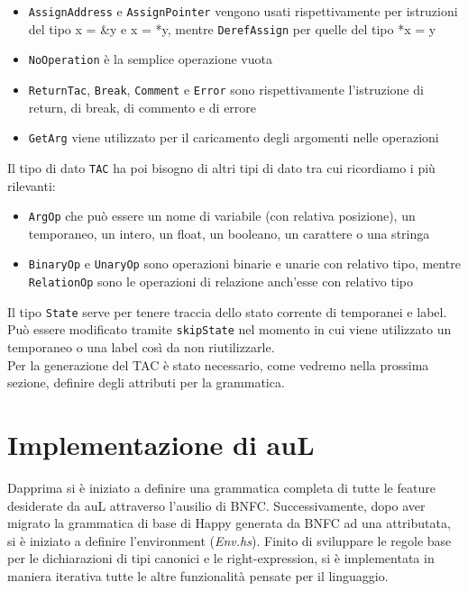 \documentclass{article}
\begin{document}
\begin{itemize}
    \item \texttt{AssignAddress} e \texttt{AssignPointer} vengono usati rispettivamente per istruzioni del tipo  x = \&y e x = *y, mentre \texttt{DerefAssign} per quelle del tipo *x = y
    \item \texttt{NoOperation} è la semplice operazione vuota
    \item \texttt{ReturnTac}, \texttt{Break}, \texttt{Comment} e \texttt{Error} sono rispettivamente l'istruzione di return, di break, di commento e di errore
    \item \texttt{GetArg} viene utilizzato per il caricamento degli argomenti nelle operazioni
\end{itemize}
Il tipo di dato \texttt{TAC} ha poi bisogno di altri tipi di dato tra cui ricordiamo i più rilevanti:
\begin{itemize}
    \item \texttt{ArgOp} che può essere un nome di variabile (con relativa posizione), un temporaneo, un intero, un float, un booleano, un carattere o una stringa
    \item \texttt{BinaryOp} e \texttt{UnaryOp} sono operazioni binarie e unarie con relativo tipo, mentre \texttt{RelationOp} sono le operazioni di relazione anch'esse con relativo tipo
\end{itemize}
Il tipo \texttt{State} serve per tenere traccia dello stato corrente di temporanei e label. Può essere modificato tramite \texttt{skipState} nel momento in cui viene utilizzato un temporaneo o una label così da non riutilizzarle.\\
Per la generazione del TAC è stato necessario, come vedremo nella prossima sezione, definire degli attributi per la grammatica.
\section{Implementazione di auL}
Dapprima si è iniziato a definire una grammatica completa di tutte le feature desiderate da auL attraverso l'ausilio di
BNFC. Successivamente, dopo aver migrato la grammatica di base di Happy generata da BNFC ad una attributata,
si è iniziato a definire l'environment (\textit{Env.hs}). Finito di sviluppare le regole base per le dichiarazioni 
di tipi canonici e le right-expression, si è implementata in maniera iterativa tutte le altre funzionalità pensate 
per il linguaggio.
\end{document}
